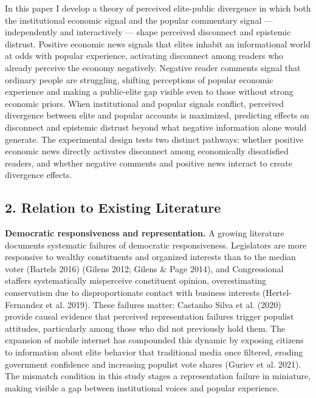 \documentclass[
  12pt]{article}
\begin{document}
In this paper I develop a theory of perceived elite-public divergence in
which both the institutional economic signal and the popular commentary
signal --- independently and interactively --- shape perceived
disconnect and epistemic distrust. Positive economic news signals that
elites inhabit an informational world at odds with popular experience,
activating disconnect among readers who already perceive the economy
negatively. Negative reader comments signal that ordinary people are
struggling, shifting perceptions of popular economic experience and
making a public-elite gap visible even to those without strong economic
priors. When institutional and popular signals conflict, perceived
divergence between elite and popular accounts is maximized, predicting
effects on disconnect and epistemic distrust beyond what negative
information alone would generate. The experimental design tests two
distinct pathways: whether positive economic news directly activates
disconnect among economically dissatisfied readers, and whether negative
comments and positive news interact to create divergence effects.

\subsection{2. Relation to Existing
Literature}\label{relation-to-existing-literature}

\textbf{Democratic responsiveness and representation.} A growing
literature documents systematic failures of democratic responsiveness.
Legislators are more responsive to wealthy constituents and organized
interests than to the median voter (Bartels 2016) (Gilens 2012; Gilens
\& Page 2014), and Congressional staffers systematically misperceive
constituent opinion, overestimating conservatism due to disproportionate
contact with business interests (Hertel-Fernandez et al. 2019). These
failures matter: Castanho Silva et al. (2020) provide causal evidence
that perceived representation failures trigger populist attitudes,
particularly among those who did not previously hold them. The expansion
of mobile internet has compounded this dynamic by exposing citizens to
information about elite behavior that traditional media once filtered,
eroding government confidence and increasing populist vote shares
(Guriev et al. 2021). The mismatch condition in this study stages a
representation failure in miniature, making visible a gap between
institutional voices and popular experience.
\end{document}
